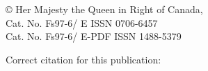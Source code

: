 \vspace*{\fill}
\begin{center}
\begin{minipage}{\widthof{\copyright{} Her Majesty the Queen in Right of Canada, \trYear{}}}
\copyright{} Her Majesty the Queen in Right of Canada, \trYear{}\\
Cat. No. Fs97-6/\trReportNum{} E \hfill ISSN 0706-6457\\
Cat. No. Fs97-6/\trReportNum{} E-PDF \hfill ISSN 1488-5379
\end{minipage}
\end{center}
\par
\bigskip
\noindent
Correct citation for this publication:
\bigskip
\par
\begin{hangparas}{1em}{1}
\trReference{}
\end{hangparas}
\clearpage
